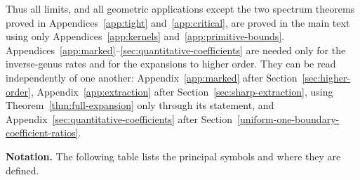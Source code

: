 Thus all limits, and all geometric applications except the two spectrum theorems proved in Appendices~\ref{app:tight} and~\ref{app:critical}, are proved in the main text using only Appendices~\ref{app:kernels} and~\ref{app:primitive-bounds}. Appendices~\ref{app:marked}--\ref{sec:quantitative-coefficients} are needed only for the inverse-genus rates and for the expansions to higher order. They can be read independently of one another: Appendix~\ref{app:marked} after Section~\ref{sec:higher-order}, Appendix~\ref{app:extraction} after Section~\ref{sec:sharp-extraction}, using Theorem~\ref{thm:full-expansion} only through its statement, and Appendix~\ref{sec:quantitative-coefficients} after Section~\ref{uniform-one-boundary-coefficient-ratios}.

\textbf{Notation.} The following table lists the principal symbols and where they are defined.
